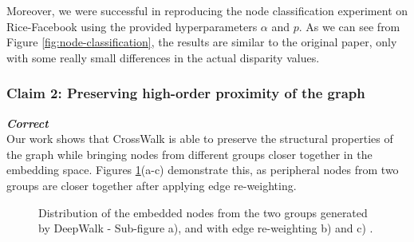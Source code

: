 Moreover, we were successful in reproducing the node classification experiment on Rice-Facebook using the provided hyperparameters $\alpha$ and $p$. As we can see from Figure \ref{fig:node-classification}, the results are similar to the original paper, only with some really small differences in the actual disparity values.



\subsubsection{Claim 2: Preserving high-order proximity of the graph}
\textit{\textbf{Correct}} \\
Our work shows that CrossWalk is able to preserve the structural properties of the graph while bringing nodes from different groups closer together in the embedding space. Figures \ref{fig:tsne}(a-c) demonstrate this, as peripheral nodes from two groups are closer together after applying edge re-weighting.
\begin{figure}[H]
    \qquad
    \qquad
    \centering
    \caption{Distribution of the embedded nodes from the two groups generated by DeepWalk - Sub-figure a), and with edge re-weighting b) and c) .}%
    \label{fig:tsne}
\end{figure}


